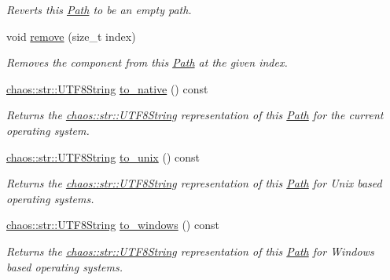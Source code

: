 \begin{DoxyCompactItemize}
\begin{DoxyCompactList}\small\item\em Reverts this \hyperlink{classchaos_1_1io_1_1sys_1_1_path}{Path} to be an empty path. \end{DoxyCompactList}\item 
void \hyperlink{classchaos_1_1io_1_1sys_1_1_path_aefc69b11820209acca278104fb230832}{remove} (size\+\_\+t index)
\begin{DoxyCompactList}\small\item\em Removes the component from this \hyperlink{classchaos_1_1io_1_1sys_1_1_path}{Path} at the given index. \end{DoxyCompactList}\item 
\hyperlink{classchaos_1_1str_1_1_u_t_f8_string}{chaos\+::str\+::\+U\+T\+F8\+String} \hyperlink{classchaos_1_1io_1_1sys_1_1_path_ac18d23b41f30a6809ae78f782fd199f0}{to\+\_\+native} () const 
\begin{DoxyCompactList}\small\item\em Returns the \hyperlink{classchaos_1_1str_1_1_u_t_f8_string}{chaos\+::str\+::\+U\+T\+F8\+String} representation of this \hyperlink{classchaos_1_1io_1_1sys_1_1_path}{Path} for the current operating system. \end{DoxyCompactList}\item 
\hyperlink{classchaos_1_1str_1_1_u_t_f8_string}{chaos\+::str\+::\+U\+T\+F8\+String} \hyperlink{classchaos_1_1io_1_1sys_1_1_path_afefa8cefde37893c6f5876d9dc692acd}{to\+\_\+unix} () const 
\begin{DoxyCompactList}\small\item\em Returns the \hyperlink{classchaos_1_1str_1_1_u_t_f8_string}{chaos\+::str\+::\+U\+T\+F8\+String} representation of this \hyperlink{classchaos_1_1io_1_1sys_1_1_path}{Path} for Unix based operating systems. \end{DoxyCompactList}\item 
\hyperlink{classchaos_1_1str_1_1_u_t_f8_string}{chaos\+::str\+::\+U\+T\+F8\+String} \hyperlink{classchaos_1_1io_1_1sys_1_1_path_a40528c53a9988b8fd330811d0d65e8cf}{to\+\_\+windows} () const 
\begin{DoxyCompactList}\small\item\em Returns the \hyperlink{classchaos_1_1str_1_1_u_t_f8_string}{chaos\+::str\+::\+U\+T\+F8\+String} representation of this \hyperlink{classchaos_1_1io_1_1sys_1_1_path}{Path} for Windows based operating systems. \end{DoxyCompactList}\item 

\end{DoxyCompactItemize}
